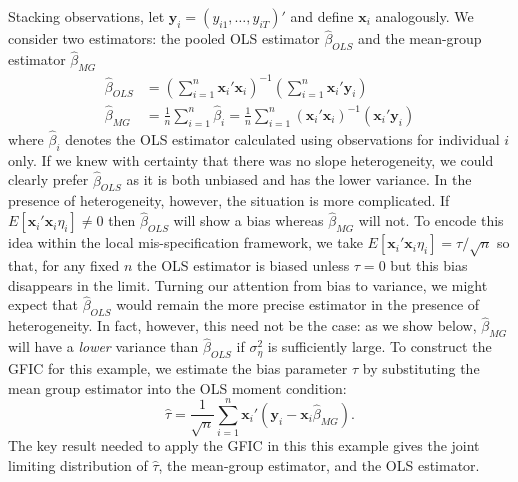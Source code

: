 Stacking observations, let $\mathbf{y}_i = (y_{i1}, \ldots, y_{iT})'$ and define $\mathbf{x}_i$ analogously. 
We consider two estimators: the pooled OLS estimator $\widehat{\beta}_{OLS}$ and the mean-group estimator $\widehat{\beta}_{MG}$
\begin{align}
\widehat{\beta}_{OLS} &= \left(\sum_{i=1}^{n} \mathbf{x}_i'  \mathbf{x}_i \right)^{-1}\left(\sum_{i=1}^{n} \mathbf{x}_i' \mathbf{y}_i   \right)\\ 
\widehat{\beta}_{MG}  &= \frac{1}{n}\sum_{i=1}^n \widehat{\beta}_i 
= \frac{1}{n} \sum_{i=1}^n \left( \mathbf{x}_i'  \mathbf{x}_i\right)^{-1}\left( \mathbf{x}_i'  \mathbf{y}_i   \right)
\end{align}
where $\widehat{\beta}_i$ denotes the OLS estimator calculated using observations for individual $i$ only. 
If we knew with certainty that there was no slope heterogeneity, we could clearly prefer $\widehat{\beta}_{OLS}$ as it is both unbiased and has the lower variance.
In the presence of heterogeneity, however, the situation is more complicated.
If $E[\mathbf{x}_i' \mathbf{x}_i \eta_i]\neq 0$ then $\widehat{\beta}_{OLS}$ will show a bias whereas $\widehat{\beta}_{MG}$ will not.
To encode this idea within the local mis-specification framework, we take $E[\mathbf{x}_i'\mathbf{x}_i \eta_i] = \tau/\sqrt{n}$ so that, for any fixed $n$ the OLS estimator is biased unless $\tau = 0$ but this bias disappears in the limit.
Turning our attention from bias to variance, we might expect that $\widehat{\beta}_{OLS}$ would remain the more precise estimator in the presence of heterogeneity.
In fact, however, this need not be the case: as we show below, $\widehat{\beta}_{MG}$ will have a \emph{lower} variance than $\widehat{\beta}_{OLS}$ if $\sigma_{\eta}^2$ is sufficiently large.
To construct the GFIC for this example, we estimate the bias parameter $\tau$ by substituting the mean group estimator into the OLS moment condition:
\begin{equation}
\widehat{\tau} = \frac{1}{\sqrt{n}} \sum_{i=1}^n \mathbf{x}_i' (\mathbf{y}_i - \mathbf{x}_i \widehat{\beta}_{MG}).
\end{equation}
The key result needed to apply the GFIC in this this example gives the joint limiting distribution of $\widehat{\tau}$, the mean-group estimator, and the OLS estimator.
